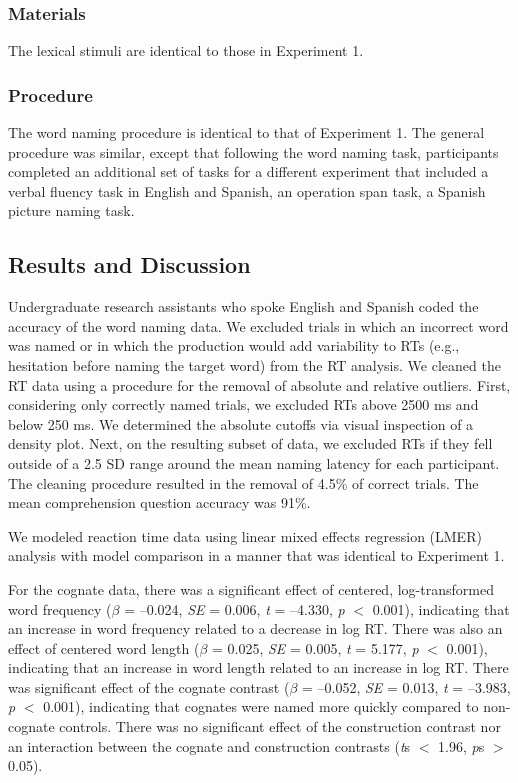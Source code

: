 \subsubsection{Materials}
\label{materials}

The lexical stimuli are identical to those in Experiment 1. 

\subsubsection{Procedure}
\label{procedure}

The word naming procedure is identical to that of Experiment 1. The general procedure was similar, except that following the word naming task, participants completed an additional set of tasks for a different experiment that included a verbal fluency task in English and Spanish, an operation span task, a Spanish picture naming task. 

\subsection{Results and Discussion}
\label{resultsanddiscussion}

Undergraduate research assistants who spoke English and Spanish coded the accuracy of the word naming data. We excluded trials in which an incorrect word was named or in which the production would add variability to RTs (e.g., hesitation before naming the target word) from the RT analysis. We cleaned the RT data using a procedure for the removal of absolute and relative outliers. First, considering only correctly named trials, we excluded RTs above 2500 ms and below 250 ms. We determined the absolute cutoffs via visual inspection of a density plot. Next, on the resulting subset of data, we excluded RTs if they fell outside of a 2.5 SD range around the mean naming latency for each participant. The cleaning procedure resulted in the removal of 4.5\% of correct trials. The mean comprehension question accuracy was 91\%.

We modeled reaction time data using linear mixed effects regression (LMER) analysis with model comparison in a manner that was identical to Experiment 1.

For the cognate data, there was a significant effect of centered, log-transformed word frequency (\emph{$\beta$} = --0.024, \emph{SE} = 0.006, \emph{t} = --4.330, \emph{p} $<$ 0.001), indicating that an increase in word frequency related to a decrease in log RT. There was also an effect of centered word length (\emph{$\beta$} = 0.025, \emph{SE} = 0.005, \emph{t} = 5.177, \emph{p} $<$ 0.001), indicating that an increase in word length related to an increase in log RT. There was significant effect of the cognate contrast (\emph{$\beta$} = --0.052, \emph{SE} = 0.013, \emph{t} = --3.983, \emph{p} $<$ 0.001), indicating that cognates were named more quickly compared to non-cognate controls. There was no significant effect of the construction contrast nor an interaction between the cognate and construction contrasts (\emph{t}s $<$ 1.96, \emph{p}s $>$ 0.05). 

